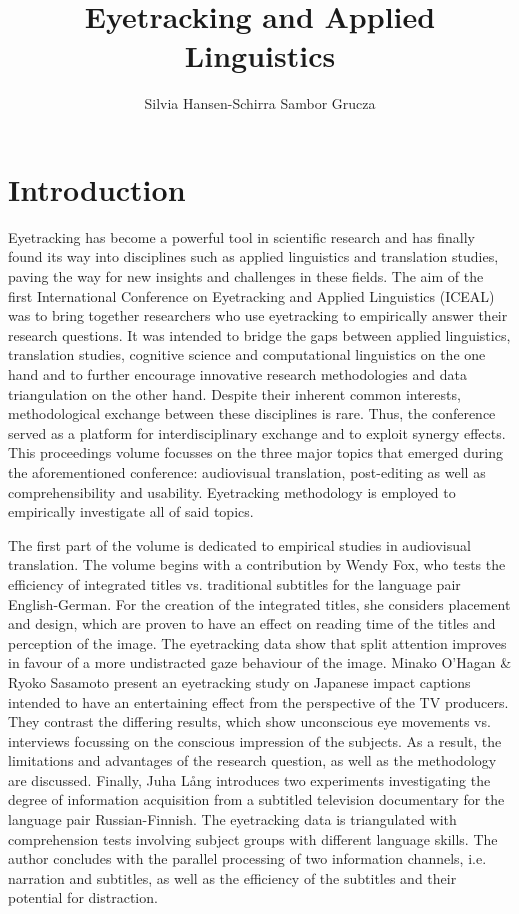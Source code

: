 \documentclass[output=paper]{langsci/langscibook}
\author{%
Silvia Hansen-Schirra\affiliation{University of Eden}%
\lastand
Sambor Grucza \affiliation{University of Pluto}
}
\title{Eyetracking and Applied Linguistics}
\begin{document}

\section{Introduction}

Eyetracking has become a powerful tool in scientific research and has finally found its way into disciplines such as applied linguistics and translation studies, paving the way for new insights and challenges in these fields. The aim of the first International Conference on Eyetracking and Applied Linguistics (ICEAL) was to bring together researchers who use eyetracking to empirically answer their research questions. It was intended to bridge the gaps between applied linguistics, translation studies, cognitive science and computational linguistics on the one hand and to further encourage innovative research methodologies and data triangulation on the other hand. Despite their inherent common interests, methodological exchange between these disciplines is rare. Thus, the conference served as a platform for interdisciplinary exchange and to exploit synergy effects. This proceedings volume focusses on the three major topics that emerged during the aforementioned conference: audiovisual translation, post-editing as well as comprehensibility and usability. Eyetracking methodology is employed to empirically investigate all of said topics. 

The first part of the volume is dedicated to empirical studies in audiovisual translation. The volume begins with a contribution by Wendy Fox, who tests the efficiency of integrated titles vs. traditional subtitles for the language pair English-German. For the creation of the integrated titles, she considers placement and design, which are proven to have an effect on reading time of the titles and perception of the image. The eyetracking data show that split attention improves in favour of a more undistracted gaze behaviour of the image. Minako O’Hagan \& Ryoko Sasamoto present an eyetracking study on Japanese impact captions intended to have an entertaining effect from the perspective of the TV producers. They contrast the differing results, which show unconscious eye movements vs. interviews focussing on the conscious impression of the subjects. As a result, the limitations and advantages of the research question, as well as the methodology are discussed. Finally, Juha Lång introduces two experiments investigating the degree of information acquisition from a subtitled television documentary for the language pair Russian-Finnish. The eyetracking data is triangulated with comprehension tests involving subject groups with different language skills. The author concludes with the parallel processing of two information channels, i.e. narration and subtitles, as well as the efficiency of the subtitles and their potential for distraction.
\end{document}
